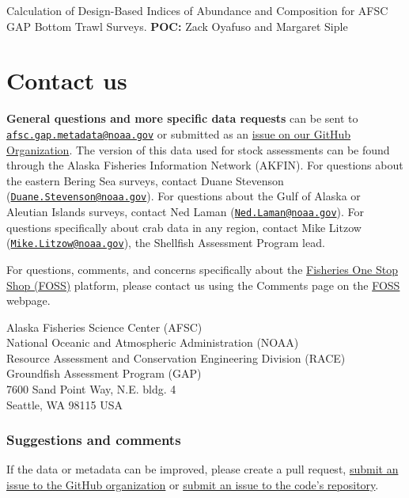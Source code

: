 \documentclass[
  letterpaper,
  oneside,
  open=any]{scrbook}
\begin{document}
Calculation of Design-Based Indices of Abundance and Composition for
AFSC GAP Bottom Trawl Surveys. \textbf{POC:} Zack Oyafuso and Margaret
Siple

\part{Contact us}

\textbf{General questions and more specific data requests} can be sent
to
\href{mailto:afsc.gap.metadata@noaa.gov}{\nolinkurl{afsc.gap.metadata@noaa.gov}}
or submitted as an
\href{https://github.com/afsc-gap-products/data-requests}{issue on our
GitHub Organization}. The version of this data used for stock
assessments can be found through the Alaska Fisheries Information
Network (AKFIN). For questions about the eastern Bering Sea surveys,
contact Duane Stevenson
(\href{mailto:Duane.Stevenson@noaa.gov}{\nolinkurl{Duane.Stevenson@noaa.gov}}).
For questions about the Gulf of Alaska or Aleutian Islands surveys,
contact Ned Laman
(\href{mailto:Ned.Laman@noaa.gov}{\nolinkurl{Ned.Laman@noaa.gov}}). For
questions specifically about crab data in any region, contact Mike
Litzow
(\href{mailto:Mike.Litzow@noaa.gov}{\nolinkurl{Mike.Litzow@noaa.gov}}),
the Shellfish Assessment Program lead.

For questions, comments, and concerns specifically about the
\href{https://www.fisheries.noaa.gov/foss}{Fisheries One Stop Shop
(FOSS)} platform, please contact us using the Comments page on the
\href{https://www.fisheries.noaa.gov/foss}{FOSS} webpage.

Alaska Fisheries Science Center (AFSC)\\
National Oceanic and Atmospheric Administration (NOAA)\\
Resource Assessment and Conservation Engineering Division (RACE)\\
Groundfish Assessment Program (GAP)\\
7600 Sand Point Way, N.E. bldg. 4\\
Seattle, WA 98115 USA

\hypertarget{suggestions-and-comments}{%
\section*{Suggestions and comments}\label{suggestions-and-comments}}


If the data or metadata can be improved, please create a pull request,
\href{https://github.com/afsc-gap-products/data-requests/issues}{submit
an issue to the GitHub organization} or
\href{https://github.com/afsc-gap-products/gap_products/issues}{submit
an issue to the code's repository}.
\end{document}
